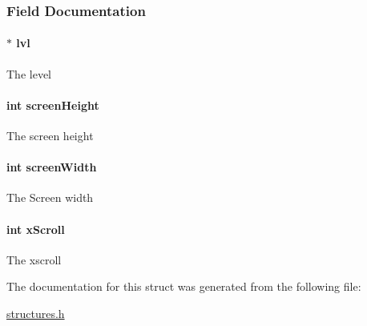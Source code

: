 \subsubsection{Field Documentation}
\hypertarget{struct_map_abca19b7de8e60347a507d1aeff95c764}{
\paragraph[{lvl}]{$\ast$ lvl}}\label{struct_map_abca19b7de8e60347a507d1aeff95c764}
The level \hypertarget{struct_map_a9ebc1dbd77788c4bfa27758a6725413f}{
\paragraph[{screen\-Height}]{\setlength{\rightskip}{0pt plus 5cm}int screen\-Height}}\label{struct_map_a9ebc1dbd77788c4bfa27758a6725413f}
The screen height \hypertarget{struct_map_ae50cb92a78d9e0a4f4bd718fc02bd294}{
\paragraph[{screen\-Width}]{\setlength{\rightskip}{0pt plus 5cm}int screen\-Width}}\label{struct_map_ae50cb92a78d9e0a4f4bd718fc02bd294}
The Screen width \hypertarget{struct_map_aa83bbdf2603e42824cd0bab44bf315c2}{
\paragraph[{x\-Scroll}]{\setlength{\rightskip}{0pt plus 5cm}int x\-Scroll}}\label{struct_map_aa83bbdf2603e42824cd0bab44bf315c2}
The xscroll 

The documentation for this struct was generated from the following file\-:\begin{DoxyCompactItemize}
\item 
\hyperlink{structures_8h}{structures.\-h}\end{DoxyCompactItemize}
